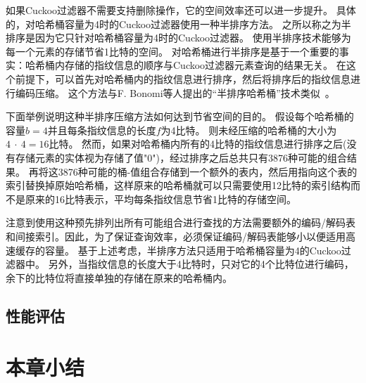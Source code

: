 如果Cuckoo过滤器不需要支持删除操作，它的空间效率还可以进一步提升。
具体的，对哈希桶容量为4时的Cuckoo过滤器使用一种半排序方法。
之所以称之为半排序是因为它只针对哈希桶容量为4时的Cuckoo过滤器。
使用半排序技术能够为每一个元素的存储节省1比特的空间。
对哈希桶进行半排序是基于一个重要的事实：哈希桶内存储的指纹信息的顺序与Cuckoo过滤器元素查询的结果无关。
在这个前提下，可以首先对哈希桶内的指纹信息进行排序，然后将排序后的指纹信息进行编码压缩。
这个方法与F. Bonomi等人提出的“半排序哈希桶”技术类似~\cite{bonomi2006improved}。

下面举例说明这种半排序压缩方法如何达到节省空间的目的。
假设每个哈希桶的容量$b = 4$并且每条指纹信息的长度$f$为4比特。
则未经压缩的哈希桶的大小为$4~\cdot~4 = 16$比特。
然而，如果对哈希桶内所有的4比特的指纹信息进行排序之后(没有存储元素的实体视为存储了值"0")，经过排序之后总共只有3876种可能的组合结果。
再将这3876种可能的桶-值组合存储到一个额外的表内，然后用指向这个表的索引替换掉原始哈希桶，这样原来的哈希桶就可以只需要使用12比特的索引结构而不是原来的16比特表示，平均每条指纹信息节省1比特的存储空间。

注意到使用这种预先排列出所有可能组合进行查找的方法需要额外的编码/解码表和间接索引。因此，为了保证查询效率，必须保证编码/解码表能够小以便适用高速缓存的容量。
基于上述考虑，半排序方法只适用于哈希桶容量为4的Cuckoo过滤器中。
另外，当指纹信息的长度大于4比特时，只对它的4个比特位进行编码，余下的比特位将直接单独的存储在原来的哈希桶内。

\subsection{性能评估}


\section{本章小结}